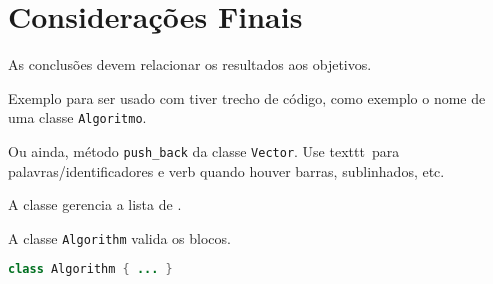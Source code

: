 \section{Considerações Finais}\label{sec:consideracoesFinais}

As conclusões devem relacionar os resultados aos objetivos. 

Exemplo para ser usado com tiver trecho de código, como exemplo o nome de uma
classe \texttt{Algoritmo}.

Ou ainda, método \verb|push_back| da classe \texttt{Vector}. Use texttt\ para
palavras/identificadores e verb quando houver barras, sublinhados, etc.

A classe  gerencia a lista de .

A classe \lstinline!Algorithm! valida os blocos.

\begin{lstlisting}[language=Java, caption={Exemplo de classe}, label={lst:ex}]
class Algorithm { ... }
\end{lstlisting}
